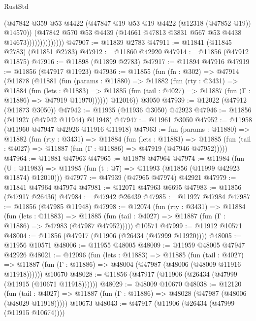 \begin{lexlean}{RustStd}
\begin{coremodule}
                            (@47842
                              @359
                              @53
                              @4422
                              (@47847 @19 @53 @19 @4422 (@12318 (@47852 @19)) @14570))
                            (@47842
                              @570
                              @53
                              @4439
                              (@14661 @47813 @3831 @567 @53 @4438 @14673))))))))))))))
@47907 := @11839 @2783
@47911 := @11841 (@11845 @2783) (@11851 @2783)
@47912 := @11860 @42920
@47914 := @11856 (@47912 @11875)
@47916 := @11898 (@11899 @2783)
@47917 := @11894 @47916
@47919 := @11856 (@47917 @11923)
@47936 := @11855
    (fun (fn : @302) =>
    @47914
      (@11878
        (@11881
          (fun (params : @11880) =>
          @11882
            (fun (rty : @3431) =>
            @11884
              (fun (lets : @11883) =>
              @11885 (fun (tail : @4027) => @11887 (fun (Γ : @11886) => @47919 @11970))))))
        @12016))
    @3050
@47939 := @12022 (@47912 (@11873 @3050))
@47942 := @11935 (@11936 @3050) @42923
@47946 := @11856 (@11927 (@47942 @11944) @11948)
@47947 := @11961 @3050
@47952 := @11958 (@11960 @47947 @42926 @11916 @11918)
@47963 := fun (params : @11880) =>
  @11882
    (fun (rty : @3431) =>
    @11884
      (fun (lets : @11883) =>
      @11885 (fun (tail : @4027) => @11887 (fun (Γ : @11886) => @47919 (@47946 @47952)))))
@47964 := @11881 @47963
@47965 := @11878 @47964
@47974 := @11984
    (fun (U : @11983) => @11985 (fun (t : @7) => @11993 (@11856 (@11999 @42923 @11874) @12010)))
@47977 := @47939 (@47965 @47974) @42921
@47979 := @11841 @47964 @47974
@47981 := @12071 @47963 @6695
@47983 := @11856 (@47917 @26436)
@47984 := @47942 @26439
@47985 := @11927 @47984
@47987 := @11856 (@47985 @11948)
@47998 := @12074
    (fun (rty : @3431) =>
    @11884
      (fun (lets : @11883) =>
      @11885 (fun (tail : @4027) => @11887 (fun (Γ : @11886) => @47983 (@47987 @47952)))))
    @10571
@47999 := @11912 @10571
@48004 := @11856 (@47917 (@11906 (@26434 (@47999 @11920))))
@48005 := @11956 @10571
@48006 := @11955 @48005
@48009 := @11959 @48005 @47947 @42926
@48021 := @12096
    (fun (lets : @11883) =>
    @11885
      (fun (tail : @4027) =>
      @11887 (fun (Γ : @11886) => @48004 (@47987 (@48006 (@48009 @11916 @11918))))))
    @10670
@48028 := @11856 (@47917 (@11906 (@26434 (@47999 (@11915 (@10671 @11918))))))
@48029 := @48009 @10670
@48038 := @12120
    (fun (tail : @4027) => @11887 (fun (Γ : @11886) => @48028 (@47987 (@48006 (@48029 @11918)))))
    @10673
@48043 := @47917 (@11906 (@26434 (@47999 (@11915 @10674))))

\end{coremodule}
\end{lexlean}
